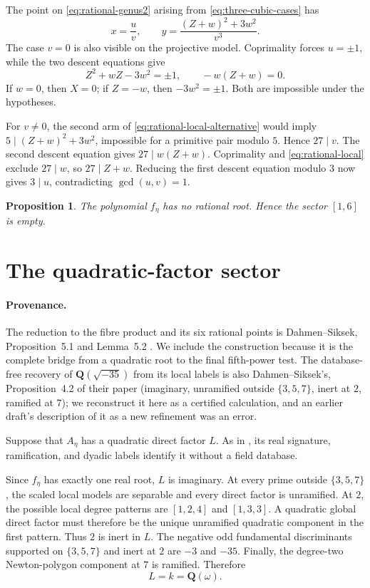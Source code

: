 \documentclass[11pt]{article}
\newcommand{\Q}{\mathbf Q}
\newtheorem{proposition}[theorem]{Proposition}
\theoremstyle{definition}
\theoremstyle{remark}
\begin{document}
The point on \eqref{eq:rational-genus2} arising from
\eqref{eq:three-cubic-cases} has
\[
 x=\frac uv,\qquad
 y=\frac{(Z+w)^2+3w^2}{v^3}.
\]
The case $v=0$ is also visible on the projective model.  Coprimality forces
$u=\pm1$, while the two descent equations give
\[
       Z^2+wZ-3w^2=\pm1,\qquad -w(Z+w)=0.
\]
If $w=0$, then $X=0$; if $Z=-w$, then $-3w^2=\pm1$.  Both are impossible
under the hypotheses.

For $v\neq0$, the second arm of
\eqref{eq:rational-local-alternative} would imply
$5\mid (Z+w)^2+3w^2$, impossible for a primitive pair modulo $5$.
Hence $27\mid v$.  The second descent equation gives
$27\mid w(Z+w)$.  Coprimality and \eqref{eq:rational-local} exclude
$27\mid w$, so $27\mid Z+w$.  Reducing the first descent equation modulo
$3$ now gives $3\mid u$, contradicting $\gcd(u,v)=1$.

\begin{proposition}\label{prop:rational-sector}
The polynomial $f_\eta$ has no rational root.  Hence the sector $[1,6]$
is empty.
\end{proposition}

\section{The quadratic-factor sector}

\paragraph{Provenance.}
The reduction to the fibre product and its six rational points is
Dahmen--Siksek, Proposition~5.1 and Lemma~5.2
\cite[Section~5]{DahmenSiksek}.  We include the construction because it is
the complete bridge from a quadratic root to the final fifth-power test.  The
database-free recovery of $\Q(\sqrt{-35})$ from its local labels is also
Dahmen--Siksek's, Proposition~4.2 of their paper (imaginary, unramified
outside $\{3,5,7\}$, inert at $2$, ramified at $7$); we reconstruct it
here as a certified calculation, and an earlier draft's description of
it as a new refinement was an error.

Suppose that $A_\eta$ has a quadratic direct factor $L$.  As in
\cite[Proposition~4.2]{DahmenSiksek}, its real signature, ramification,
and dyadic labels identify it without a field database.

Since $f_\eta$ has exactly one real root, $L$ is imaginary.  At every prime
outside $\{3,5,7\}$, the scaled local models are separable and every direct
factor is unramified.  At $2$, the possible local degree patterns are
$[1,2,4]$ and $[1,3,3]$.  A quadratic global direct factor must therefore
be the unique unramified quadratic component in the first pattern.  Thus
$2$ is inert in $L$.  The negative odd fundamental discriminants supported
on $\{3,5,7\}$ and inert at $2$ are $-3$ and $-35$.  Finally, the
degree-two Newton-polygon component at $7$ is ramified.  Therefore
\begin{equation}\label{eq:quadratic-field}
                              L=k=\Q(\omega).
\end{equation}
\end{document}
